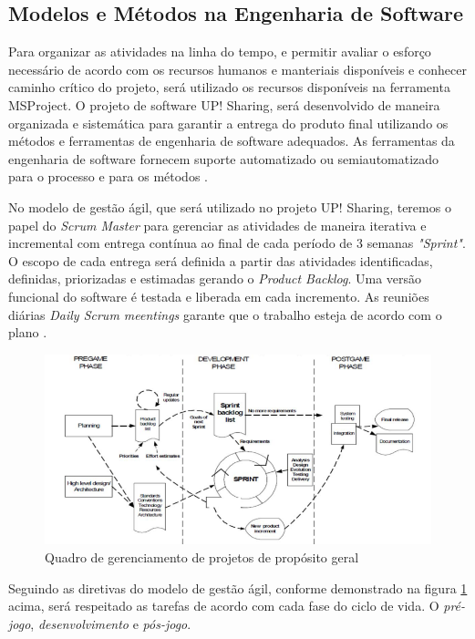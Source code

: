 \documentclass[12pt]{article}
\begin{document}
\subsection{Modelos e Métodos na Engenharia de Software}

Para organizar as atividades na linha do tempo, e permitir avaliar o esforço necessário de acordo com os recursos humanos e manteriais disponíveis e conhecer caminho crítico do projeto, será utilizado os recursos disponíveis na ferramenta MSProject. O projeto de software UP! Sharing, será desenvolvido de maneira organizada e sistemática para garantir a entrega do produto final utilizando os métodos e ferramentas de engenharia de software adequados. As ferramentas da engenharia de software fornecem suporte automatizado ou semiautomatizado para o processo e para os métodos \cite{Pressman}.

No modelo de gestão ágil, que será utilizado no projeto UP! Sharing, teremos o papel do \textit{Scrum Master} para gerenciar as atividades de maneira iterativa e incremental com entrega contínua ao final de cada período de 3 semanas \textit{"Sprint"}. O escopo de cada entrega será definida a partir das atividades identificadas, definidas, priorizadas e estimadas gerando o \textit{Product Backlog}. Uma versão funcional do software é testada e liberada em cada incremento. As reuniões diárias \textit{Daily Scrum meentings} garante que o trabalho esteja de acordo com o plano \cite{Swebok}.  


\begin{figure}[htp]
\centering
\includegraphics[scale=.8]{ScrumModel.png}
\caption{Quadro de gerenciamento de projetos de propósito geral}
\label{fig:exampleFig5}
\end{figure}

Seguindo as diretivas do modelo de gestão ágil, conforme demonstrado na figura \ref{fig:exampleFig5} acima, será respeitado as tarefas de acordo com cada fase do ciclo de vida. O \textit{pré-jogo}, \textit{desenvolvimento} e \textit{pós-jogo}.
\end{document}
